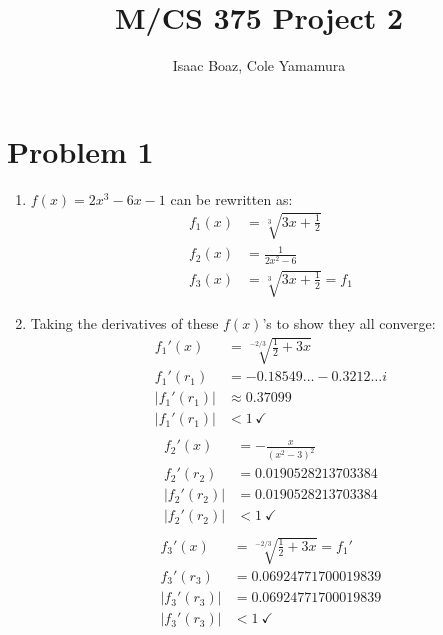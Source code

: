\documentclass{article}
\title{\vspace{-5ex}M/CS 375 Project 2}
\author{Isaac Boaz, Cole Yamamura}
\begin{document}
\maketitle

\section*{Problem 1}
\begin{enumerate}[label=(\alph*)]
    \item \(f(x) = 2x^3 - 6x - 1\) can be rewritten as:
        \begin{align*}
            f_1(x) & = \sqrt[3]{3x+\frac{1}{2}} \\
            f_2(x) & = \frac{1}{2x^2-6}  \\
            f_3(x) & = \sqrt[3]{3x+\frac{1}{2}} = f_1
        \end{align*}
    \item Taking the derivatives of these \(f(x)\)'s to show they all converge:
        \begin{align*}
            f_1'(x) &= \sqrt[-2/3]{\frac{1}{2} + 3x}\ \\
                    f_1'(r_1) & = -0.18549\ldots - 0.3212\ldots i \\
                    |f_1'(r_1)| & \approx 0.37099 \\
                    |f_1'(r_1)| & < 1\, \checkmark \\
        \end{align*}
        \begin{align*}
            f_2'(x) &= -\frac{x}{(x^2-3)^2} \\
                    f_2'(r_2) & = 0.0190528213703384 \\
                    |f_2'(r_2)| & = 0.0190528213703384 \\
                    |f_2'(r_2)| & < 1\ \checkmark \\
        \end{align*}
        \begin{align*}
            f_3'(x) &= \sqrt[-2/3]{\frac{1}{2} + 3x} = f_1' \\
            f_3'(r_3) &= 0.06924771700019839 \\
            |f_3'(r_3)|& = 0.06924771700019839 \\
            |f_3'(r_3)| &< 1\ \checkmark
        \end{align*}
\end{enumerate}

\pagebreak
\end{document}
